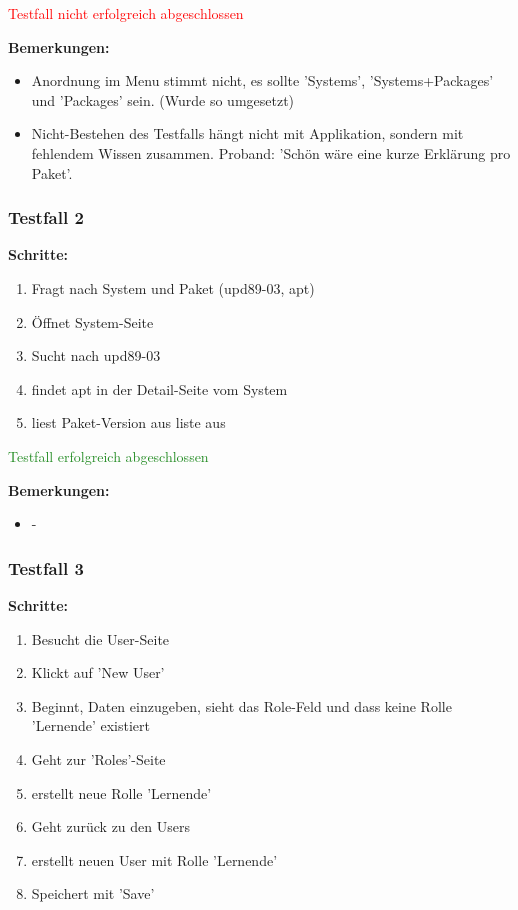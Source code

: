 {\textcolor{Red}{Testfall nicht erfolgreich abgeschlossen}

\bigskip
\textbf{Bemerkungen:}

\begin{itemize}[noitemsep,nolistsep]
    \item Anordnung im Menu stimmt nicht, es sollte 'Systems', 'Systems+Packages' und 'Packages' sein. (Wurde so umgesetzt)
    \item Nicht-Bestehen des Testfalls hängt nicht mit Applikation, sondern mit fehlendem Wissen zusammen. Proband: 'Schön wäre eine kurze Erklärung pro Paket'.
\end{itemize}


\subsubsection*{Testfall 2}

\textbf{Schritte:}

\begin{enumerate}
    \item Fragt nach System und Paket (upd89-03, apt)
    \item Öffnet System-Seite
    \item Sucht nach upd89-03
    \item findet apt in der Detail-Seite vom System
    \item liest Paket-Version aus liste aus
\end{enumerate}

\textcolor{ForestGreen}{Testfall erfolgreich abgeschlossen}

\bigskip
\textbf{Bemerkungen:}

\begin{itemize}[noitemsep,nolistsep]
    \item -
\end{itemize}


\subsubsection*{Testfall 3}

\textbf{Schritte:}

\begin{enumerate}
    \item Besucht die User-Seite
    \item Klickt auf 'New User'
    \item Beginnt, Daten einzugeben, sieht das Role-Feld und dass keine Rolle 'Lernende' existiert
    \item Geht zur 'Roles'-Seite
    \item erstellt neue Rolle 'Lernende'
    \item Geht zurück zu den Users
    \item erstellt neuen User mit Rolle 'Lernende'
    \item Speichert mit 'Save'
\end{enumerate}

}
